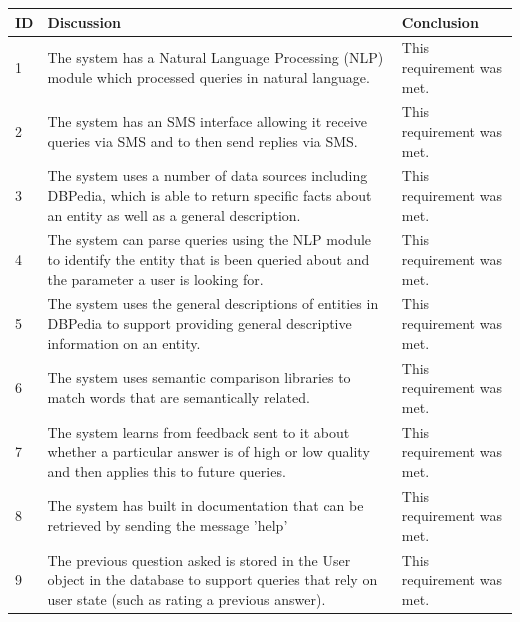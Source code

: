 \documentclass[authoryearcitations]{UoYCSproject}
\begin{document}
\begin{table}[h]
\begin{tabular}{|p{0.4cm}|p{9cm}|p{4.0cm}|}
\hline
ID & Discussion                                                                                                                                                                           & Conclusion                \\ \hline
1  & The system has a Natural Language Processing (NLP) module which processed queries in natural language.                                                                               & This requirement was met. \\ \hline
2  & The system has an SMS interface allowing it receive queries via SMS and to then send replies via SMS.                                                                                & This requirement was met. \\ \hline
3  & The system uses a number of data sources including DBPedia, which is able to return specific facts about an entity as well as a general description.                                 & This requirement was met. \\ \hline
4  & The system can parse queries using the NLP module to identify the entity that is been queried about and the parameter a user is looking for.                                         & This requirement was met. \\ \hline
5  & The system uses the general descriptions of entities in DBPedia to support providing general descriptive information on an entity.                                                   & This requirement was met. \\ \hline
6  & The system uses semantic comparison libraries to match words that are semantically related.                                                                                          & This requirement was met. \\ \hline
7  & The system learns from feedback sent to it about whether a particular answer is of high or low quality and then applies this to future queries.                                      & This requirement was met. \\ \hline
8  & The system has built in documentation that can be retrieved by sending the message 'help'                                                                                            & This requirement was met. \\ \hline
9  & The previous question asked is stored in the User object in the database to support queries that rely on user state (such as rating a previous answer).                              & This requirement was met. \\ \hline

\end{tabular}
\end{table}
\end{document}
